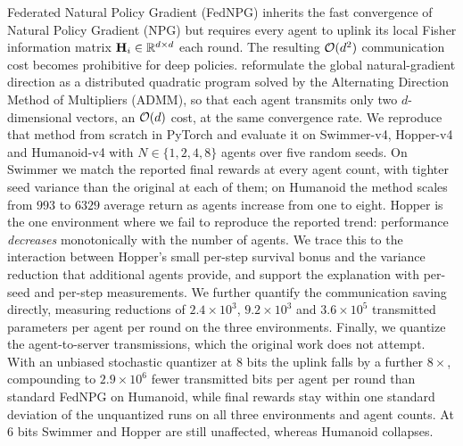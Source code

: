 Federated Natural Policy Gradient (FedNPG) inherits the fast convergence of
Natural Policy Gradient (NPG) but
requires every agent to uplink its local Fisher information matrix $\mathbf{H}_i \in
\mathbb{R}^{d\times d}$ each round. The resulting $\mathcal{O}(d^2)$ communication cost
becomes prohibitive for deep policies. \citet{lan2023fednpgadmm} reformulate
the global natural-gradient direction as a distributed quadratic program
solved by the Alternating Direction Method of Multipliers (ADMM), so that
each agent transmits only two $d$-dimensional vectors,
an $\mathcal{O}(d)$ cost, at the same convergence rate. We reproduce that method from
scratch in PyTorch and evaluate it on Swimmer-v4, Hopper-v4 and Humanoid-v4
with $N \in \{1,2,4,8\}$ agents over five random seeds. On Swimmer we match
the reported final rewards at every agent count, with tighter seed variance
than the original at each of them; on Humanoid the method scales from
$993$ to $6329$ average return as agents increase from one to eight. Hopper is
the one environment where we fail to reproduce the reported trend: performance
\emph{decreases} monotonically with the number of agents. We trace this to the
interaction between Hopper's small per-step survival bonus and the variance
reduction that additional agents provide, and support the explanation with
per-seed and per-step measurements. We further quantify the communication
saving directly, measuring reductions of $2.4\times 10^{3}$, $9.2\times
10^{3}$ and $3.6\times 10^{5}$ transmitted parameters per agent per round on
the three environments.
Finally, we quantize the agent-to-server transmissions, which the original
work does not attempt. With an unbiased stochastic quantizer at 8 bits the
uplink falls by a further $8\times$, compounding to $2.9\times 10^{6}$ fewer
transmitted bits per agent per round than standard FedNPG on Humanoid, while
final rewards stay within one standard deviation of the unquantized runs on all
three environments and agent counts. At 6 bits Swimmer and Hopper are still
unaffected, whereas Humanoid collapses.
